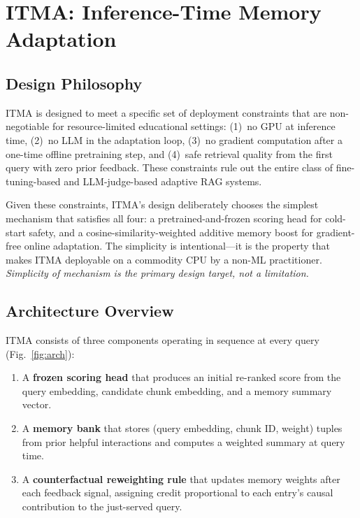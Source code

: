 \documentclass[journal]{IEEEtran}
\begin{document}
\section{ITMA: Inference-Time Memory Adaptation}
\label{sec:itma}

\subsection{Design Philosophy}
ITMA is designed to meet a specific set of deployment constraints that are
non-negotiable for resource-limited educational settings: (1)~no GPU at
inference time, (2)~no LLM in the adaptation loop, (3)~no gradient
computation after a one-time offline pretraining step, and (4)~safe
retrieval quality from the first query with zero prior feedback.  These
constraints rule out the entire class of fine-tuning-based and
LLM-judge-based adaptive RAG systems.

Given these constraints, ITMA's design deliberately chooses the simplest
mechanism that satisfies all four: a pretrained-and-frozen scoring head
for cold-start safety, and a cosine-similarity-weighted additive memory
boost for gradient-free online adaptation.  The simplicity is
intentional---it is the property that makes ITMA deployable on a commodity
CPU by a non-ML practitioner.  \emph{Simplicity of mechanism is the
primary design target, not a limitation.}

\subsection{Architecture Overview}
ITMA consists of three components operating in sequence at every query
(Fig.~\ref{fig:arch}):
\begin{enumerate}
  \item A \textbf{frozen scoring head} that produces an initial re-ranked
        score from the query embedding, candidate chunk embedding, and a
        memory summary vector.
  \item A \textbf{memory bank} that stores (query embedding, chunk ID,
        weight) tuples from prior helpful interactions and computes a
        weighted summary at query time.
  \item A \textbf{counterfactual reweighting rule} that updates memory
        weights after each feedback signal, assigning credit proportional
        to each entry's causal contribution to the just-served query.
\end{enumerate}
\end{document}
